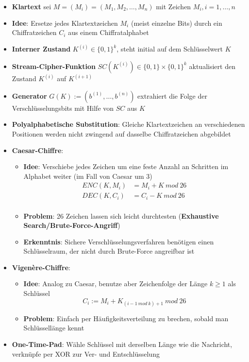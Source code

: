 \begin{itemize}
	\item \textbf{Klartext} sei $M = (M_i) = (M_1, M_2, \dots, M_n)$ mit Zeichen $M_i, i = 1, \dots, n$
	\item \textbf{Idee}: Ersetze jedes Klartextzeichen $M_i$ (meist einzelne Bits) durch ein Chiffratzeichen $C_i$ aus einem Chiffratalphabet
	\item \textbf{Interner Zustand} $K^{(i)} \in \{0, 1\}^k$, steht initial auf dem Schlüsselwert $K$
	\item \textbf{Stream-Cipher-Funktion} $SC(K^{(i)}) \in \{0, 1\} \times \{0, 1\}^k$ aktualisiert den Zustand $K^{(i)}$ auf $K^{(i+1)}$
	\item \textbf{Generator} $G(K) := (b^{(1)}, \dots, b^{(n)})$ extrahiert die Folge der Verschlüsselungsbits mit Hilfe von $SC$ aus $K$
	\item \textbf{Polyalphabetische Substitution}: Gleiche Klartextzeichen an verschiedenen Positionen werden nicht zwingend auf dasselbe Chiffratzeichen abgebildet
	\item \textbf{Caesar-Chiffre}:
	\begin{itemize}
		\item \textbf{Idee}: Verschiebe jedes Zeichen um eine feste Anzahl an Schritten im Alphabet weiter (im Fall von Caesar um 3)
		\begin{align*}
			ENC(K, M_i) &= M_i + K\ mod\ 26\\
			DEC(K, C_i) &= C_i - K\ mod\ 26\\
		\end{align*}
		\item \textbf{Problem}: 26 Zeichen lassen sich leicht durchtesten (\textbf{Exhaustive Search/Brute-Force-Angriff})
		\item \textbf{Erkenntnis}: Sichere Verschlüsselungsverfahren benötigen einen Schlüsselraum, der nicht durch Brute-Force angreifbar ist
	\end{itemize}
	\item \textbf{Vigenère-Chiffre}:
	\begin{itemize}
		\item \textbf{Idee}: Analog zu Caesar, benutze aber Zeichenfolge der Länge $k \geq 1$ als Schlüssel
		$$
			C_i := M_i + K_{(i-1\ mod\ k) + 1}\ mod\ 26
		$$
		\item \textbf{Problem}: Einfach per Häufigkeitsverteilung zu brechen, sobald man Schlüssellänge kennt
	\end{itemize}
	\item \textbf{One-Time-Pad}: Wähle Schlüssel mit derselben Länge wie die Nachricht, verknüpfe per XOR zur Ver- und Entschlüsselung

\end{itemize}
